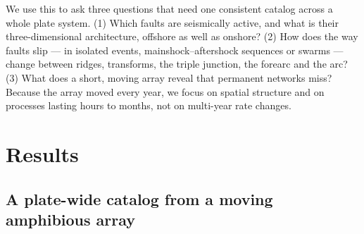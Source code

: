 \documentclass[11pt]{article}
\begin{document}
We use this to ask three questions that need one consistent catalog
across a whole plate system. (1) Which faults are seismically active,
and what is their three-dimensional architecture, offshore as well as
onshore? (2) How does the way faults slip --- in isolated events,
mainshock--aftershock sequences or swarms --- change between ridges,
transforms, the triple junction, the forearc and the arc? (3) What does
a short, moving array reveal that permanent networks miss? Because the
array moved every year, we focus on spatial structure and on processes
lasting hours to months, not on multi-year rate changes.

\section{Results}\label{results}

\subsection{A plate-wide catalog from a moving amphibious
array}\label{a-plate-wide-catalog-from-a-moving-amphibious-array}
\end{document}
